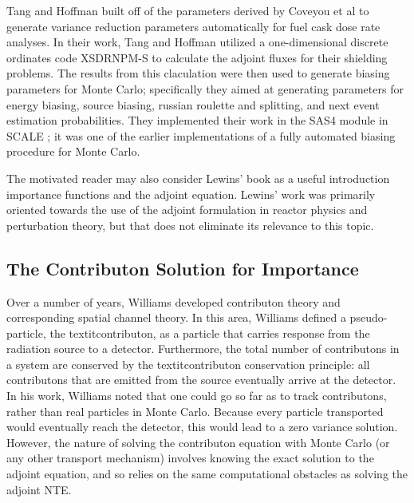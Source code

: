 Tang and Hoffman \cite{tang_monte_1988} built off of the parameters derived by
Coveyou et al \cite{coveyou_adjoint_1967} to generate variance reduction
parameters automatically for fuel cask dose rate analyses. In their work, Tang
and Hoffman utilized a one-dimensional discrete ordinates code XSDRNPM-S to
calculate the adjoint fluxes for their shielding problems. The results from this
claculation were then used to generate biasing parameters for Monte Carlo;
specifically they aimed at generating parameters for energy biasing, source
biasing, russian roulette and splitting, and next event estimation
probabilities. They implemented their work in the SAS4 module in SCALE
\cite{SCALE6_1}; it was
one of the earlier implementations of a fully automated biasing procedure for
Monte Carlo.


The motivated reader may also consider Lewins' book
\cite{lewins_importance_1965} as a
useful introduction importance functions and the adjoint equation. Lewins' work was
primarily oriented towards the use of the adjoint formulation in reactor physics and
perturbation theory, but that does not eliminate its relevance to this topic.


\subsection{The Contributon Solution for Importance}
\label{sec:ContributonImportance}

Over a number of years, Williams
\cite{williams_generalized_1991,williams_contributorn_1992,williams_contributon_study}
developed contributon theory and corresponding spatial channel theory. In this
area, Williams defined a pseudo-particle, the textit{contributon}, as a particle
that carries response from the radiation source to a detector. Furthermore, the
total number of contributons in a system are conserved by the textit{contributon
conservation principle}: all contributons that are emitted from the source
eventually arrive at the detector.  In his work, Williams noted that one could
go so far as to track contributons, rather than real particles in Monte Carlo.
Because every particle transported would eventually reach the detector, this
would lead to a zero variance solution. However, the nature of solving the
contributon equation with Monte Carlo (or any other transport mechanism)
involves knowing the exact solution to the adjoint equation, and so relies on
the same computational obstacles as solving the adjoint NTE.

